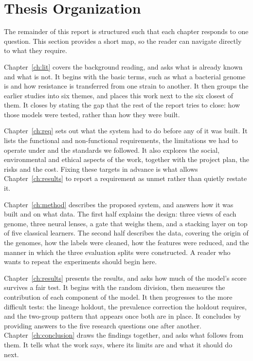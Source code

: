 \section{Thesis Organization}
\label{sec:organization}

The remainder of this report is structured such that each chapter responds to one question. This section provides a short map, so the reader can navigate directly to what they require.

Chapter~\ref{ch:lit} covers the background reading, and asks what is already known and what is not. It begins with the basic terms, such as what a bacterial genome is and how resistance is transferred from one strain to another. It then groups the earlier studies into six themes, and places this work next to the six closest of them. It closes by stating the gap that the rest of the report tries to close: how those models were tested, rather than how they were built.

Chapter~\ref{ch:req} sets out what the system had to do before any of it was built. It lists the functional and non-functional requirements, the limitations we had to operate under and the standards we followed. It also explores the social, environmental and ethical aspects of the work, together with the project plan, the risks and the cost. Fixing these targets in advance is what allows Chapter~\ref{ch:results} to report a requirement as unmet rather than quietly restate it.

Chapter~\ref{ch:method} describes the proposed system, and answers how it was built and on what data. The first half explains the design: three views of each genome, three neural lenses, a gate that weighs them, and a stacking layer on top of five classical learners. The second half describes the data, covering the origin of the genomes, how the labels were cleaned, how the features were reduced, and the manner in which the three evaluation splits were constructed. A reader who wants to repeat the experiments should begin here.

Chapter~\ref{ch:results} presents the results, and asks how much of the model's score survives a fair test. It begins with the random division, then measures the contribution of each component of the model. It then progresses to the more difficult tests: the lineage holdout, the prevalence correction the holdout requires, and the two-group pattern that appears once both are in place. It concludes by providing answers to the five research questions one after another. Chapter~\ref{ch:conclusion} draws the findings together, and asks what follows from them. It tells what the work says, where its limits are and what it should do next.
